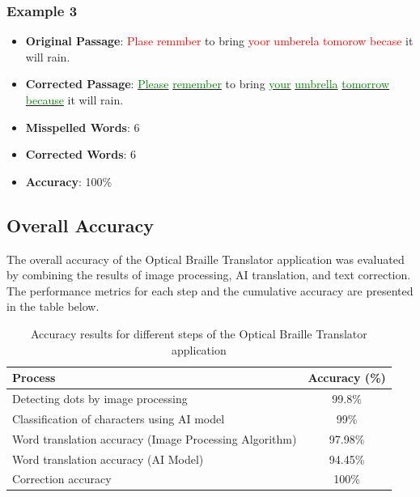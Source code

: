 \subsubsection*{Example 3}
\begin{itemize}
    \item \textbf{Original Passage}: \textcolor{red}{Plase} \textcolor{red}{remmber} to bring \textcolor{red}{yoor} \textcolor{red}{umberela} \textcolor{red}{tomorow} \textcolor{red}{becase} it will rain.
    \item \textbf{Corrected Passage}: \uline{\textcolor{green}{Please}} \uline{\textcolor{green}{remember}} to bring \uline{\textcolor{green}{your}} \uline{\textcolor{green}{umbrella}} \uline{\textcolor{green}{tomorrow}} \uline{\textcolor{green}{because}} it will rain.
    \item \textbf{Misspelled Words}: 6
    \item \textbf{Corrected Words}: 6
    \item \textbf{Accuracy}: 100\%
\end{itemize}




\subsection{Overall Accuracy}
The overall accuracy of the Optical Braille Translator application was evaluated by combining the results of image processing, AI translation, and text correction. The performance metrics for each step and the cumulative accuracy are presented in the table below.

\begin{table}[h!]
    \centering
    \begin{tabular}{|l|c|}
        \hline
        \textbf{Process} & \textbf{Accuracy (\%)} \\
        \hline
        Detecting dots by image processing & 99.8\% \\
        \hline
        Classification of characters using AI model & 99\% \\
         \hline
        Word translation accuracy (Image Processing Algorithm) & 97.98\% \\
        \hline
        Word translation accuracy (AI Model) & 94.45\%\\
       
        \hline
        Correction accuracy & 100\% \\
        \hline
       
    \end{tabular}
    \caption{Accuracy results for different steps of the Optical Braille Translator application}
\end {table}

